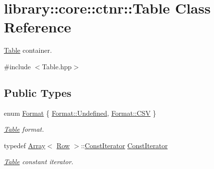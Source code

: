 \hypertarget{classlibrary_1_1core_1_1ctnr_1_1_table}{}\section{library\+::core\+::ctnr\+::Table Class Reference}
\label{classlibrary_1_1core_1_1ctnr_1_1_table}


\mbox{\hyperlink{classlibrary_1_1core_1_1ctnr_1_1_table}{Table}} container.  




{\ttfamily \#include $<$Table.\+hpp$>$}

\subsection*{Public Types}
\begin{DoxyCompactItemize}
\item 
enum \mbox{\hyperlink{classlibrary_1_1core_1_1ctnr_1_1_table_ab1d81689432c3a6bc960d33db1e11a4c}{Format}} \{ \mbox{\hyperlink{classlibrary_1_1core_1_1ctnr_1_1_table_ab1d81689432c3a6bc960d33db1e11a4caec0fc0100c4fc1ce4eea230c3dc10360}{Format\+::\+Undefined}}, 
\mbox{\hyperlink{classlibrary_1_1core_1_1ctnr_1_1_table_ab1d81689432c3a6bc960d33db1e11a4cacc8d68c551c4a9a6d5313e07de4deafd}{Format\+::\+C\+SV}}
 \}
\begin{DoxyCompactList}\small\item\em \mbox{\hyperlink{classlibrary_1_1core_1_1ctnr_1_1_table}{Table}} format. \end{DoxyCompactList}\item 
typedef \mbox{\hyperlink{classlibrary_1_1core_1_1ctnr_1_1_array}{Array}}$<$ \mbox{\hyperlink{classlibrary_1_1core_1_1ctnr_1_1table_1_1_row}{Row}} $>$\+::\mbox{\hyperlink{classlibrary_1_1core_1_1ctnr_1_1_table_a7fa78ad4e7e8d27ceab0bff51ab84fc3}{Const\+Iterator}} \mbox{\hyperlink{classlibrary_1_1core_1_1ctnr_1_1_table_a7fa78ad4e7e8d27ceab0bff51ab84fc3}{Const\+Iterator}}
\begin{DoxyCompactList}\small\item\em \mbox{\hyperlink{classlibrary_1_1core_1_1ctnr_1_1_table}{Table}} constant iterator. \end{DoxyCompactList}\end{DoxyCompactItemize}
